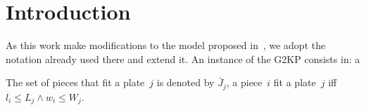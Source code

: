 \documentclass[runningheads]{llncs}
\begin{document}
 
\section{Introduction}


As this work make modifications to the model proposed in~\cite{furini:2016},
we adopt the notation already used there and extend it.
An instance of the G2KP consists in: a






The set of pieces that fit a plate~\(j\) is denoted by \(\bar{J}_j\), a piece~\(i\) fit a plate~\(j\) iff \(l_i \leq L_j \land w_i \leq W_j\).
\end{document}

